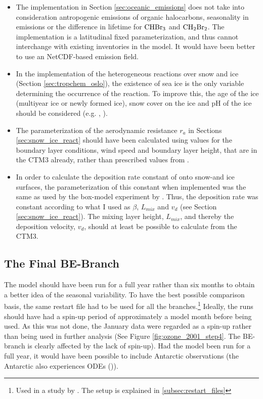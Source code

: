 \begin{itemize}
    \item The implementation in Section \ref{sec:oceanic_emissions} does not take into consideration antropogenic emissions of organic halocarbons, seasonality in emissions or the difference in lifetime for $\mathrm{CHBr_3}$ and $\mathrm{CH_2Br_2}$. The implementation is a latitudinal fixed parameterization, and thus cannot interchange with existing inventories in the model. It would have been better to use an NetCDF-based emission field. 
    \item In the implementation of the heterogeneous reactions over snow and ice (Section \ref{sec:tropchem_oslo}), the existence of sea ice is the only variable determining the occurrence of the reaction. To improve this, the age of the ice (multiyear ice or newly formed ice), snow cover on the ice and pH of the ice should be considered (e.g. \cite{Thomas2011}, \cite{Peterson2019}).
    \item The parameterization of the aerodynamic resistance $r_a$ in Sections \ref{sec:snow_ice_react} should have been calculated using values for the boundary layer conditions, wind speed and boundary layer height, that are in the CTM3 already, rather than prescribed values from \cite{CAO}. 
    \item In order to calculate the deposition rate constant of  onto snow-and ice surfaces, the parameterization of this constant when implemented was the same as used by the box-model experiment by \cite{CAO}. Thus, the deposition rate was constant according to what I used as $\beta$, $L_{mix}$ and $v_d$ (see Section \ref{sec:snow_ice_react}). The mixing layer height, $L_{mix}$, and thereby the deposition velocity, $v_d$, should at least be possible to calculate from the CTM3. 
\end{itemize}


\subsection{The Final BE-Branch}


The model should have been run for a full year rather than six months to obtain a better idea of the seasonal variability. To have the best possible comparison basis, the same restart file had to be used for all the branches.\footnote{Used in a study by \cite{Falk_2019}. The setup is explained in \ref{subsec:restart_files}} Ideally, the runs should have had a spin-up period of approximately a model month before being used. As this was not done, the January data were regarded as a spin-up rather than being used in further analysis (See Figure \ref{fig:ozone_2001_step4}. The BE-branch is clearly affected by the lack of spin-up). Had the model been run for a full year, it would have been possible to include Antarctic observations (the Antarctic also experiences ODEs (\cite{Simpson2015})).

